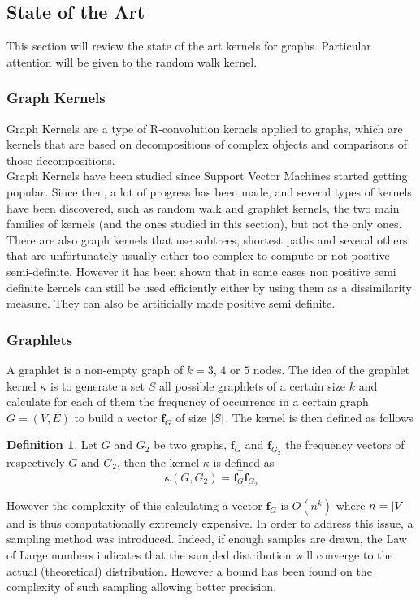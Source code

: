\documentclass{article}
\DeclarePairedDelimiter{\abs}{\lvert}{\rvert}
\let\vec\mathbf
\theoremstyle{definition}
\newtheorem{definition}{Definition}
\begin{document}
\subsection{State of the Art}
This section will review the state of the art kernels for graphs. Particular attention will be given to the random walk kernel.
\subsubsection{Graph Kernels}
Graph Kernels are a type of R-convolution kernels\cite{haussler99convolution} applied to graphs, which are kernels that are based on decompositions of complex objects and comparisons of those decompositions.\\
Graph Kernels have been studied since Support Vector Machines started getting popular\cite{kashima_graphkers_2003}. Since then, a lot of progress has been made, and several types of kernels have been discovered, such as random walk and graphlet\cite{shervashidze_efficient_2009} kernels, the two main families of kernels (and the ones studied in this section), but not the only ones.
There are also graph kernels that use subtrees\cite{ramon2003expressivity}, shortest paths\cite{borgwardt2005shortest} and several others that are unfortunately usually  either too complex to compute or not positive semi-definite\cite{shervashidze2012scalable}. However it has been shown\cite{schlkopf_learning_2001} that in some cases non positive semi definite kernels can still be used efficiently either by using them as a dissimilarity measure. They can also be artificially made positive semi definite.
\subsubsection{Graphlets}
A graphlet is a non-empty graph of $k=3$, $4$ or $5$ nodes. The idea of the graphlet kernel $\kappa$ is to generate a set $S$ all possible graphlets of a certain size $k$ and calculate for each of them the frequency of occurrence in a certain graph $G=(V,E)$ to build a vector $\vec{f}_G$ of size $\abs{S}$. The kernel is then defined as follows
\begin{definition}
	Let $G$ and $G_2$ be two graphs, $\vec{f}_G$ and $\vec{f}_{G_2}$ the frequency vectors of respectively $G$ and $G_2$, then the kernel $\kappa$ is defined as
	\begin{equation}
		\kappa(G,G_{2})=\vec{f}_{G}^{\top}\vec{f}_{G_2}
	\end{equation}
\end{definition}
However the complexity of this calculating a vector $\vec{f}_G$ is $O(n^k)$ where $n=\abs{V}$ and is thus computationally extremely expensive. In order to address this issue, a sampling method was introduced. Indeed, if enough samples are drawn, the Law of Large numbers indicates that the sampled distribution will converge to the actual (theoretical) distribution. However a bound has been found on the complexity of such sampling\cite{weissman2003inequalities} allowing better precision.
\end{document}
